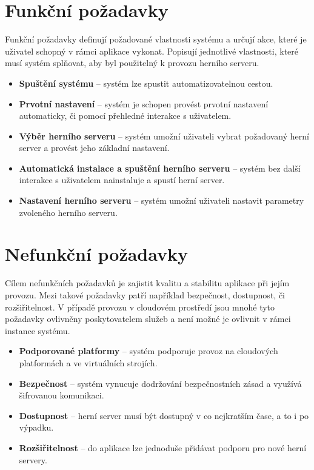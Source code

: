 \section{Funkční požadavky}

Funkční požadavky definují požadované vlastnosti systému a určují akce, které je uživatel schopný v rámci aplikace vykonat.
Popisují jednotlivé vlastnosti, které musí systém splňovat, aby byl použitelný k provozu herního serveru.

\begin{itemize}
    \item \textbf{Spuštění systému} -- systém lze spustit automatizovatelnou cestou.
    \item \textbf{Prvotní nastavení} -- systém je schopen provést prvotní nastavení automaticky, či pomocí přehledné interakce s uživatelem. 
    \item \textbf{Výběr herního serveru} -- systém umožní uživateli vybrat požadovaný herní server a provést jeho základní nastavení.
    \item \textbf{Automatická instalace a spuštění herního serveru} -- systém bez další interakce s uživatelem nainstaluje a spustí herní server.
    \item \textbf{Nastavení herního serveru} -- systém umožní uživateli nastavit parametry zvoleného herního serveru.
\end{itemize}

\section{Nefunkční požadavky}

Cílem nefunkčních požadavků je zajistit kvalitu a stabilitu aplikace při jejím provozu. Mezi takové požadavky patří například bezpečnost, dostupnost, či rozšiřitelnost.
V případě provozu v cloudovém prostředí jsou mnohé tyto požadavky ovlivněny poskytovatelem služeb a není možné je ovlivnit v rámci instance systému.

\begin{itemize}
    \item \textbf{Podporované platformy} -- systém podporuje provoz na cloudových platformách a ve virtuálních strojích.
    \item \textbf{Bezpečnost} -- systém vynucuje dodržování bezpečnostních zásad a využívá šifrovanou komunikaci.
    \item \textbf{Dostupnost} -- herní server musí být dostupný v co nejkratším čase, a to i po výpadku.
    \item \textbf{Rozšiřitelnost} -- do aplikace lze jednoduše přidávat podporu pro nové herní servery.
\end{itemize}

